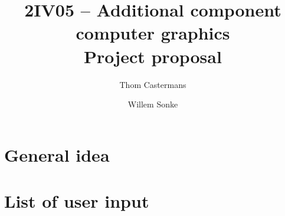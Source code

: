 \documentclass[a4paper,10pt]{article}
\title{2IV05 -- Additional component computer graphics \\ \textbf{Project proposal}}
\author{Thom Castermans \and Willem Sonke}
\begin{document}
\maketitle

\section{General idea}
\label{sec:general idea}


\section{List of user input}
\label{sec:user-input}

\end{document}
